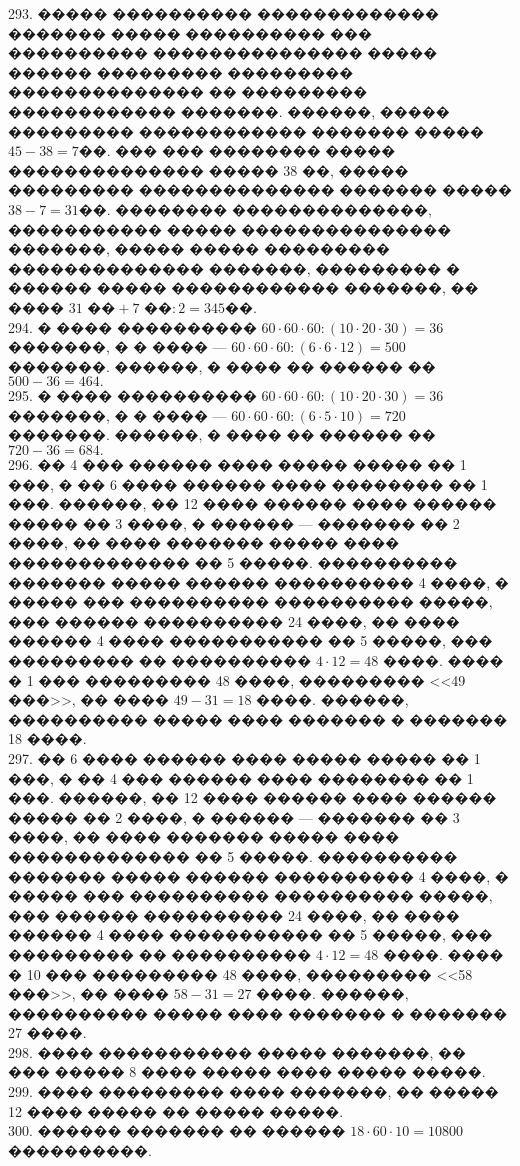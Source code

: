\documentclass[12pt]{article}
\begin{document}
293. ����� ���������� ������������� ������� ����� ���������� ��� ���������� ��������������� ����� ������ ��������� ��������� �������������� �� ��������� ������������ �������. ������, ����� ��������� ������������ ������� ����� $45-38=7$��. ��� ��� �������� ����� �������������� ����� 38 ��, ����� ��������� �������������� ������� ����� $38-7=31$��. �������� ��������������, ����������� ����� ��������������� �������, ����� ����� ��������� �������������� �������, ��������� � ������ ����� ������������ �������, �� ���� $31\text{ ��}+7\text{ ��}:2=345$��.\\
294. � ���� ���������� $60\cdot60\cdot60:(10\cdot20\cdot30)=36$ �������, � � ���� --- $60\cdot60\cdot60:(6\cdot6\cdot12)=500$ �������. ������, � ���� �� ������ �� $500-36=464.$\\
295. � ���� ���������� $60\cdot60\cdot60:(10\cdot20\cdot30)=36$ �������, � � ���� --- $60\cdot60\cdot60:(6\cdot5\cdot10)=720$ �������. ������, � ���� �� ������ �� $720-36=684.$\\
296. �� 4 ��� ������ ���� ����� ����� �� 1 ���, � �� 6 ���� ������ ���� �������� �� 1 ���. ������, �� 12 ���� ������ ���� ������ ����� �� 3 ����, � ������ --- ������� �� 2 ����, �� ���� ������� ����� ���� ������������� �� 5 �����. ���������� ������� ����� ������ ���������� 4 ����, � ����� ��� ���������� ���������� �����, ��� ������ ���������� 24 ����, �� ���� ������ 4 ���� ����������� �� 5 �����, ��� ��������� �� ���������� $4\cdot12=48$ ����. ���� � 1 ��� ��������� 48 ����, ��������� <<49 ���>>, �� ���� $49-31=18$ ����. ������, ���������� ����� ���� ������� � ������� 18 ����.\\
297. �� 6 ���� ������ ���� ����� ����� �� 1 ���, � �� 4 ��� ������ ���� �������� �� 1 ���. ������, �� 12 ���� ������ ���� ������ ����� �� 2 ����, � ������ --- ������� �� 3 ����, �� ���� ������� ����� ���� ������������� �� 5 �����. ���������� ������� ����� ������ ���������� 4 ����, � ����� ��� ���������� ���������� �����, ��� ������ ���������� 24 ����, �� ���� ������ 4 ���� ����������� �� 5 �����, ��� ��������� �� ���������� $4\cdot12=48$ ����. ���� � 10 ��� ��������� 48 ����, ��������� <<58 ���>>, �� ���� $58-31=27$ ����. ������, ���������� ����� ���� ������� � ������� 27 ����.\\
298. ���� ����������� ����� �������, �� ��� ����� 8 ���� ����� ���� ����� �����.\\
299. ���� ��������� ���� �������, �� ����� 12 ���� ����� �� ����� �����.\\
300. ������ ������� �� ������ $18\cdot60\cdot10=10800$ ����������.\\
\end{document}
